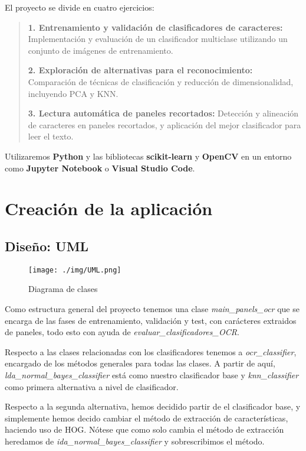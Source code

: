 \documentclass[a4paper, 12pt]{article}
\begin{document}
El proyecto se divide en cuatro ejercicios:

\begin{quote}
	\textbf{1. Entrenamiento y validación de clasificadores de caracteres:} Implementación y evaluación de un clasificador multiclase utilizando un conjunto de imágenes de entrenamiento.
	
	\textbf{2. Exploración de alternativas para el reconocimiento:} Comparación de técnicas de clasificación y reducción de dimensionalidad, incluyendo PCA y KNN.

	\textbf{3. Lectura automática de paneles recortados:} Detección y alineación de caracteres en paneles recortados, y aplicación del mejor clasificador para leer el texto.
	
\end{quote}


Utilizaremos \textbf{Python} y las bibliotecas \textbf{scikit-learn} y \textbf{OpenCV} en un entorno como \textbf{Jupyter Notebook} o \textbf{Visual Studio Code}.

\section{Creación de la aplicación}
\subsection{Diseño: UML}
\begin{figure}
	\centering
	\texttt{[image: ./img/UML.png]}
	\caption{Diagrama de clases}
	\label{fig:uml}
\end{figure}

Como estructura general del proyecto tenemos una clase \textit{main\_panels\_ocr} que se encarga de las fases de entrenamiento, validación y test, con carácteres extraidos de paneles, todo esto con ayuda de \textit{evaluar\_clasificadores\_OCR}.

Respecto a las clases relacionadas con los clasificadores tenemos a \textit{ocr\_classifier}, encargado de los métodos generales para todas las clases. A partir de aquí, \textit{lda\_normal\_bayes\_classifier} está como nuestro clasificador base y \textit{knn\_classifier} como primera alternativa a nivel de clasificador. 

Respecto a la segunda alternativa, hemos decidido partir de el clasificador base, y simplemente hemos decido cambiar el método de extracción de características, haciendo uso de HOG. Nótese que como solo cambia el método de extracción heredamos de \textit{ida\_normal\_bayes\_classifier}  y sobrescribimos el método.
\end{document}
